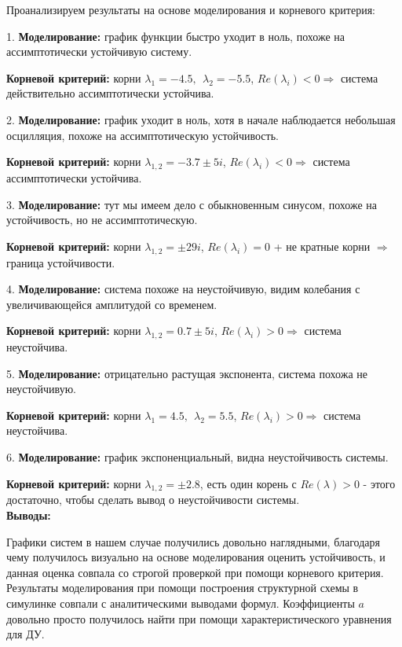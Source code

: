 Проанализируем результаты на основе моделирования и корневого критерия:



1. \textbf{Моделирование: }график функции быстро уходит в ноль, похоже на ассимптотически устойчивую систему.

   \textbf{Корневой критерий:} корни $\lambda_1 =-4.5,~~\lambda_2 =-5.5$, $Re(\lambda_i )<0\Rightarrow$ система действительно ассимптотически устойчива.

2. \textbf{Моделирование: }график уходит в ноль, хотя в начале наблюдается небольшая осцилляция, похоже на ассимптотическую устойчивость.

   \textbf{Корневой критерий:} корни $\lambda_{1,2} =-3.7\pm 5i$, $Re(\lambda_i )<0\Rightarrow$ система ассимптотически устойчива.

3.  \textbf{Моделирование: }тут мы имеем дело с обыкновенным синусом, похоже на устойчивость, но не ассимптотическую.

   \textbf{Корневой критерий:} корни $\lambda_{1,2} =\pm 29i$, $Re(\lambda_i )=0$ + не кратные корни $\Rightarrow$ граница устойчивости.

4.  \textbf{Моделирование: }система похоже на неустойчивую, видим колебания с увеличивающейся амплитудой со временем.

   \textbf{Корневой критерий:} корни $\lambda_{1,2} =0.7\pm 5i$, $Re(\lambda_i )>0\Rightarrow$ система неустойчива.

5.  \textbf{Моделирование: }отрицательно растущая экспонента, система похожа не неустойчивую.

   \textbf{Корневой критерий:} корни $\lambda_1 =4.5,~~\lambda_2 =5.5$, $Re(\lambda_i )>0\Rightarrow$ система неустойчива.

6.  \textbf{Моделирование: }график экспоненциальный, видна неустойчивость системы.

   \textbf{Корневой критерий:} корни $\lambda_{1,2} =\pm 2.8$, есть один корень с $Re(\lambda )>0$ - этого достаточно, чтобы сделать вывод о неустойчивости системы.
\\



\textbf{Выводы:}


Графики систем в нашем случае получились довольно наглядными, благодаря чему получилось визуально на основе моделирования оценить устойчивость, и данная оценка совпала со строгой проверкой при помощи корневого критерия. Результаты моделирования при помощи построения структурной схемы в симулинке совпали с аналитическими выводами формул. Коэффициенты $a$ довольно просто получилось найти при помощи характеристического уравнения для ДУ.



